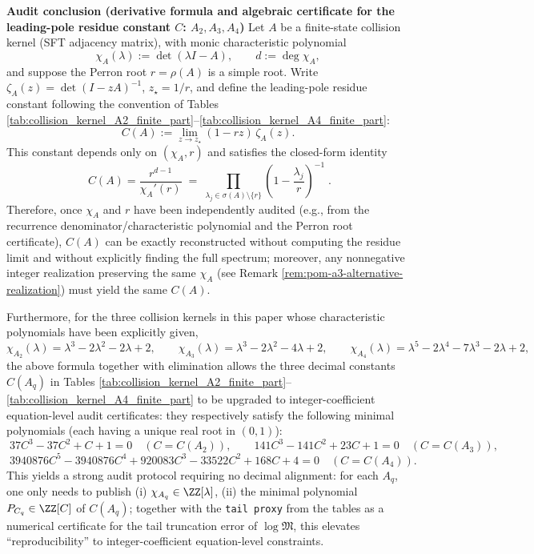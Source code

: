 \par
\medskip\noindent\textbf{Audit conclusion (derivative formula and algebraic certificate for the leading-pole residue constant \(C\): \(A_2,A_3,A_4\))}
Let \(A\) be a finite-state collision kernel (SFT adjacency matrix), with monic characteristic polynomial
\[
\chi_A(\lambda):=\det(\lambda I-A),\qquad d:=\deg\chi_A,
\]
and suppose the Perron root \(r=\rho(A)\) is a simple root. Write
\(
\zeta_A(z)=\det(I-zA)^{-1}
\), \(z_\star=1/r\), and define the leading-pole residue constant following the convention of Tables \ref{tab:collision_kernel_A2_finite_part}--\ref{tab:collision_kernel_A4_finite_part}:
\[
C(A):=\lim_{z\to z_\star}(1-rz)\,\zeta_A(z).
\]
This constant depends only on \((\chi_A,r)\) and satisfies the closed-form identity
\[
\boxed{\;
C(A)=\frac{r^{d-1}}{\chi_A'(r)}
\;=\;
\prod_{\lambda_j\in\sigma(A)\setminus\{r\}}\left(1-\frac{\lambda_j}{r}\right)^{-1}\; }.
\]
Therefore, once \(\chi_A\) and \(r\) have been independently audited (e.g., from the recurrence denominator/characteristic polynomial and the Perron root certificate), \(C(A)\) can be exactly reconstructed without computing the residue limit and without explicitly finding the full spectrum; moreover, any nonnegative integer realization preserving the same \(\chi_A\) (see Remark \ref{rem:pom-a3-alternative-realization}) must yield the same \(C(A)\).
\par
Furthermore, for the three collision kernels in this paper whose characteristic polynomials have been explicitly given,
\[
\chi_{A_2}(\lambda)=\lambda^3-2\lambda^2-2\lambda+2,\qquad
\chi_{A_3}(\lambda)=\lambda^3-2\lambda^2-4\lambda+2,\qquad
\chi_{A_4}(\lambda)=\lambda^5-2\lambda^4-7\lambda^3-2\lambda+2,
\]
the above formula together with elimination allows the three decimal constants \(C(A_q)\) in Tables \ref{tab:collision_kernel_A2_finite_part}--\ref{tab:collision_kernel_A4_finite_part} to be upgraded to integer-coefficient equation-level audit certificates: they respectively satisfy the following minimal polynomials (each having a unique real root in \((0,1)\)):
\[
\boxed{\;
37C^3-37C^2+C+1=0\quad(C=C(A_2)),\qquad
141C^3-141C^2+23C+1=0\quad(C=C(A_3)),}
\]
\[
\boxed{\;
3940876C^5-3940876C^4+920083C^3-33522C^2+168C+4=0\quad(C=C(A_4)).}
\]
This yields a strong audit protocol requiring no decimal alignment: for each \(A_q\), one only needs to publish (i) \(\chi_{A_q}\in\ZZ[\lambda]\), (ii) the minimal polynomial \(P_{C_q}\in\ZZ[C]\) of \(C(A_q)\); together with the \texttt{tail proxy} from the tables as a numerical certificate for the tail truncation error of \(\log\mathfrak{M}\), this elevates ``reproducibility'' to integer-coefficient equation-level constraints.


